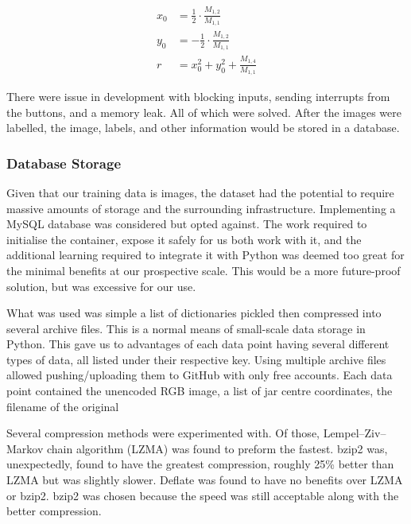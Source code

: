 \documentclass[11pt]{article}
\begin{document}
                \begin{align}
                    x_0 &= \frac{1}{2} \cdot \frac{M_{1,2}}{M_{1,1}} \label{eq:x_0}\\
                    y_0 &= -\frac{1}{2} \cdot \frac{M_{1,2}}{M_{1,1}} \label{eq:y_0}\\
                    r   &= x_0^2 + y_0^2 + \frac{M_{1,4}}{M_{1,1}} \label{eq:r}
                \end{align}

                There were issue in development with blocking inputs, sending interrupts from the buttons, and a memory leak. All of which were solved. After the images were labelled, the image, labels, and other information would be stored in a database.

            \subsubsection{Database Storage}
                Given that our training data is images, the dataset had the potential to require massive amounts of storage and the surrounding infrastructure. Implementing a MySQL database was considered but opted against. The work required to initialise the container, expose it safely for us both work with it, and the additional learning required to integrate it with Python was deemed too great for the minimal benefits at our prospective scale. This would be a more future-proof solution, but was excessive for our use.

                What was used was simple a list of dictionaries pickled then compressed into several archive files. This is a normal means of small-scale data storage in Python. This gave us to advantages of each data point having several different types of data, all listed under their respective key. Using multiple archive files allowed pushing/uploading them to GitHub with only free accounts. Each data point contained the unencoded RGB image, a list of jar centre coordinates, the filename of the original
                
                Several compression methods were experimented with. Of those, Lempel–Ziv–Markov chain algorithm (LZMA) was found to preform the fastest. bzip2 was, unexpectedly, found to have the greatest compression, roughly 25\% better than LZMA but was slightly slower. Deflate was found to have no benefits over LZMA or bzip2. bzip2 was chosen because the speed was still acceptable along with the better compression.
\end{document}
